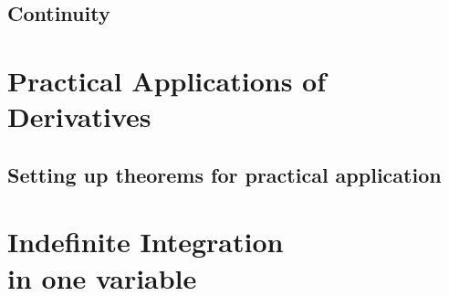 \chapter{Continuity}










\part{Practical Applications of Derivatives}

\chapter{Setting up theorems for practical application}









\part{Indefinite Integration\\ \quad in one variable}








\printbibliography[title = {Aliquam}]


